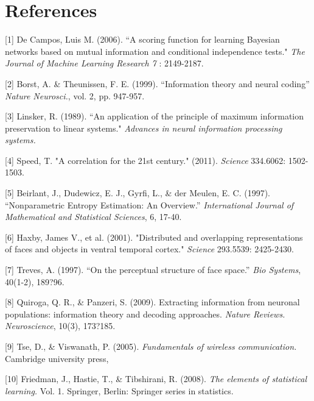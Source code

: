 \documentclass{article}
\begin{document}


\section*{References}

\small

[1] De Campos, Luis M. (2006). ``A scoring function for learning Bayesian networks
based on mutual information and conditional independence tests." \emph{The
Journal of Machine Learning Research 7} : 2149-2187.

[2] Borst, A. \& Theunissen, F. E. (1999). ``Information theory and neural coding''
\emph{Nature Neurosci.}, vol. 2, pp. 947-957.

[3] Linsker, R. (1989). ``An application of the principle of maximum
information preservation to linear systems." \emph{Advances in neural
information processing systems.} 

[4] Speed, T. "A correlation for the 21st century."  (2011). \emph{Science}
334.6062: 1502-1503.

[5] Beirlant, J., Dudewicz, E. J., Gyrfi, L., \& der Meulen,
E. C. (1997). ``Nonparametric Entropy Estimation: An
Overview.'' \emph{International Journal of Mathematical and Statistical
Sciences}, 6, 17-40.

[6] Haxby, James V., et al.  (2001). "Distributed and overlapping representations of faces and objects in ventral temporal cortex." \emph{Science} 293.5539: 2425-2430.

[7] Treves, A. (1997). ``On the perceptual structure of face space.'' \emph{Bio Systems}, 40(1-2), 189?96. 

[8] Quiroga, Q. R., \& Panzeri, S. (2009). Extracting information from neuronal populations: information theory and decoding approaches. \emph{Nature Reviews. Neuroscience}, 10(3), 173?185.

[9] Tse, D., \& Viswanath, P. (2005). \emph{Fundamentals of wireless
communication.} Cambridge university press, 

[10] Friedman, J., Hastie, T., \& Tibshirani, R. (2008). \emph{The elements
of statistical learning.} Vol. 1. Springer, Berlin: Springer series in
statistics.
\end{document}
